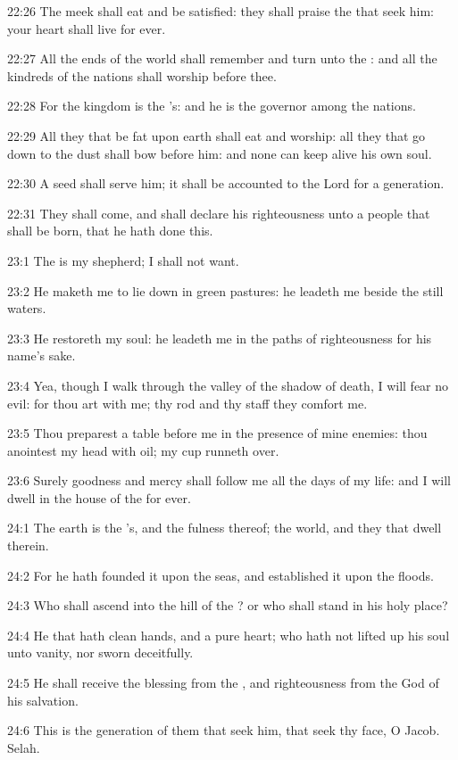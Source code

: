 22:26 The meek shall eat and be satisfied: they shall praise the \LORD
that seek him: your heart shall live for ever.

22:27 All the ends of the world shall remember and turn unto the \LORD:
and all the kindreds of the nations shall worship before thee.

22:28 For the kingdom is the \LORD's: and he is the governor among the
nations.

22:29 All they that be fat upon earth shall eat and worship: all they
that go down to the dust shall bow before him: and none can keep alive
his own soul.

22:30 A seed shall serve him; it shall be accounted to the Lord for a
generation.

22:31 They shall come, and shall declare his righteousness unto a
people that shall be born, that he hath done this.



23:1 The \LORD is my shepherd; I shall not want.

23:2 He maketh me to lie down in green pastures: he leadeth me beside
the still waters.

23:3 He restoreth my soul: he leadeth me in the paths of righteousness
for his name's sake.

23:4 Yea, though I walk through the valley of the shadow of death, I
will fear no evil: for thou art with me; thy rod and thy staff they
comfort me.

23:5 Thou preparest a table before me in the presence of mine enemies:
thou anointest my head with oil; my cup runneth over.

23:6 Surely goodness and mercy shall follow me all the days of my
life: and I will dwell in the house of the \LORD for ever.



24:1 The earth is the \LORD's, and the fulness thereof; the world, and
they that dwell therein.

24:2 For he hath founded it upon the seas, and established it upon the
floods.

24:3 Who shall ascend into the hill of the \LORD? or who shall stand in
his holy place?

24:4 He that hath clean hands, and a pure heart; who hath not lifted
up his soul unto vanity, nor sworn deceitfully.

24:5 He shall receive the blessing from the \LORD, and righteousness
from the God of his salvation.

24:6 This is the generation of them that seek him, that seek thy face,
O Jacob. Selah.

